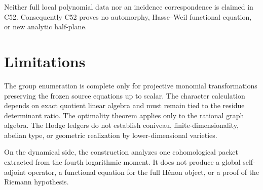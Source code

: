 Neither full local polynomial data nor an incidence correspondence is
claimed in C52.  Consequently C52 proves no automorphy, Hasse--Weil
functional equation, or new analytic half-plane.

\section{Limitations}

The group enumeration is complete only for projective monomial
transformations preserving the frozen source equations up to scalar.
The character calculation depends on exact quotient linear algebra and
must remain tied to the residue determinant ratio.  The optimality
theorem applies only to the rational graph algebra.  The Hodge ledgers
do not establish coniveau, finite-dimensionality, abelian type, or
geometric realization by lower-dimensional varieties.

On the dynamical side, the construction analyzes one cohomological
packet extracted from the fourth logarithmic moment.  It does not
produce a global self-adjoint operator, a functional equation for the
full H\'enon object, or a proof of the Riemann hypothesis.
